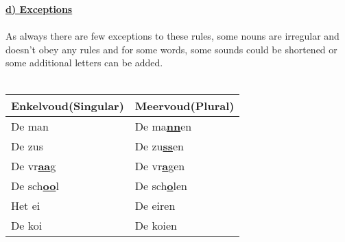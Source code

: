 \documentclass[a4paper,14pt]{extarticle}
\newcommand{\emp}[1]{\underline{\textbf{#1}}}
\begin{document}
\emp{d) Exceptions} \\ \\
As always there are few exceptions to these rules, some nouns are irregular and doesn't obey any rules and for some words, some sounds could be shortened or some additional letters can be added. \\ \\
\begin{tabularx}{\textwidth}{ p{} p{} }
 \hline
 Enkelvoud(Singular) & Meervoud(Plural)\\
 \hline
 De man & De ma\emp{nn}en \\
 De zus & De zu\emp{ss}en \\
 De vr\emp{aa}g & De vr\emp{a}gen \\
 De sch\emp{oo}l & De sch\emp{o}len \\
 Het ei & De eiren \\
 De koi & De koien \\
\end{tabularx}
\end{document}
